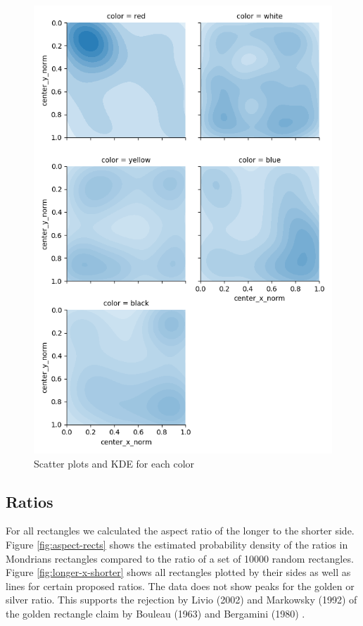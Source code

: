 \documentclass[serif,article,noparskip]{agse-thesis}
\begin{document}
\begin{figure}
\includegraphics[width=\linewidth]{images/kernel-densities.png}
\caption{Scatter plots and KDE for each color}
\label{fig:kde}
\end{figure}

\subsection{Ratios} \label{ratios}

For all rectangles we calculated the aspect ratio of the longer to the shorter
side. Figure \ref{fig:aspect-rects} shows the estimated probability density of
the ratios in Mondrians rectangles compared to the ratio of a set of 10000
random rectangles. Figure \ref{fig:longer-x-shorter} shows all rectangles
plotted by their sides as well as lines for certain proposed ratios. The data
does not show peaks for the golden or silver ratio. This supports the rejection
by Livio (2002) \cite{Livio2002} and Markowsky (1992) \cite{Markowsky1992} of
the golden rectangle claim by Bouleau (1963) \cite{bouleau1963} and Bergamini
(1980) \cite{bergamini1980}.
\end{document}
